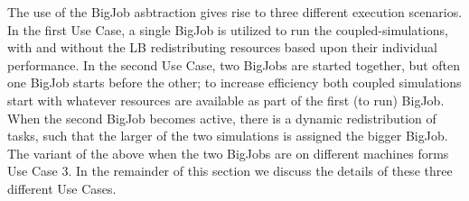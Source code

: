 \documentclass[conference,final]{IEEEtran}
\newcommand{\jhanote}[1]{ {\textcolor{red} { ***Jha: #1 }}}
\newcommand{\jhanote}[1]{}
\begin{document}
The use of the BigJob asbtraction gives rise to three different execution scenarios. In the first Use Case, a single BigJob is utilized to run the coupled-simulations, with
and without the LB redistributing resources based upon their individual performance. 
In the second Use Case, two BigJobs are started together, but often one BigJob starts before the other; to increase efficiency both coupled simulations start with whatever resources are available as part of the first (to run) BigJob. When the second BigJob becomes active, there is a dynamic redistribution of tasks, such that the larger of the two simulations is assigned the bigger BigJob. The variant of the above when the two BigJobs are on different machines forms Use Case 3. In the remainder of this section we discuss the details of these three different Use Cases.


\end{document}
